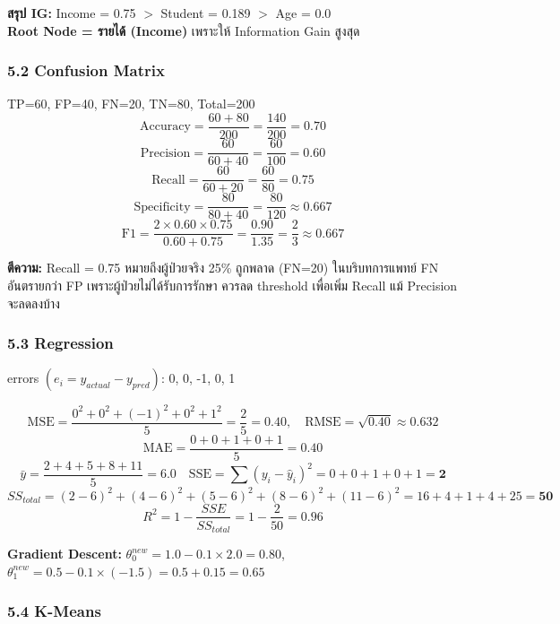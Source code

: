 \documentclass[a4paper,12pt]{article}
\begin{document}
\textbf{สรุป IG:} Income = 0.75 $>$ Student = 0.189 $>$ Age = 0.0\\
\textbf{Root Node = รายได้ (Income)} เพราะให้ Information Gain สูงสุด

\subsubsection*{5.2 Confusion Matrix}

TP=60, FP=40, FN=20, TN=80, Total=200
\[
\text{Accuracy} = \frac{60+80}{200} = \frac{140}{200} = \mathbf{0.70}
\]
\[
\text{Precision} = \frac{60}{60+40} = \frac{60}{100} = \mathbf{0.60}
\]
\[
\text{Recall} = \frac{60}{60+20} = \frac{60}{80} = \mathbf{0.75}
\]
\[
\text{Specificity} = \frac{80}{80+40} = \frac{80}{120} \approx \mathbf{0.667}
\]
\[
\text{F1} = \frac{2 \times 0.60 \times 0.75}{0.60 + 0.75} = \frac{0.90}{1.35} = \frac{2}{3} \approx \mathbf{0.667}
\]

\textbf{ตีความ:} Recall = 0.75 หมายถึงผู้ป่วยจริง 25\% ถูกพลาด (FN=20) ในบริบทการแพทย์ FN อันตรายกว่า FP เพราะผู้ป่วยไม่ได้รับการรักษา ควรลด threshold เพื่อเพิ่ม Recall แม้ Precision จะลดลงบ้าง

\subsubsection*{5.3 Regression}

errors $(e_i = y_{actual} - y_{pred})$: 0, 0, -1, 0, 1

\[
\text{MSE} = \frac{0^2+0^2+(-1)^2+0^2+1^2}{5} = \frac{2}{5} = \mathbf{0.40}, \quad
\text{RMSE} = \sqrt{0.40} \approx \mathbf{0.632}
\]
\[
\text{MAE} = \frac{0+0+1+0+1}{5} = \mathbf{0.40}
\]
\[
\bar{y} = \frac{2+4+5+8+11}{5} = 6.0
\quad
\text{SSE} = \sum(y_i - \hat{y}_i)^2 = 0+0+1+0+1 = \mathbf{2}
\]
\[
SS_{total} = (2-6)^2+(4-6)^2+(5-6)^2+(8-6)^2+(11-6)^2 = 16+4+1+4+25 = \mathbf{50}
\]
\[
R^2 = 1 - \frac{SSE}{SS_{total}} = 1 - \frac{2}{50} = \mathbf{0.96}
\]

\textbf{Gradient Descent:}
$\theta_0^{new} = 1.0 - 0.1 \times 2.0 = \mathbf{0.80}$,\quad
$\theta_1^{new} = 0.5 - 0.1 \times (-1.5) = 0.5 + 0.15 = \mathbf{0.65}$

\subsubsection*{5.4 K-Means}
\end{document}
